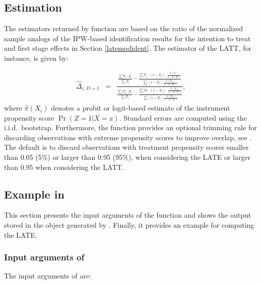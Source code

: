\documentclass[nojss]{jss}
\begin{document}
\subsection{Estimation}

The estimators returned by function  are based on the ratio of the normalized sample analogs of the IPW-based identification results for the intention to treat and first stage effects in Section \ref{latemodident}. The estimator of the LATT, for instance, is given by:

\begin{eqnarray}\label{late8}
\hat{\Delta}_{c,D=1} &=& \frac{\frac{\sum Y_i \cdot Z_i}{\sum Z_i} - \frac{\sum Y_i \cdot (1-Z_i)\cdot \frac{\hat{\pi}(X_i)}{1-\hat{\pi}(X_i)}}{\sum (1-Z_i) \frac{\hat{\pi}(X_i)}{1-\hat{\pi}(X_i)}}}
{\frac{\sum D_i \cdot Z_i}{\sum Z_i} - \frac{\sum D_i \cdot (1-Z_i)\cdot \frac{\hat{\pi}(X_i)}{1-\hat{\pi}(X_i)}}{\sum (1-Z_i) \frac{\hat{\pi}(X_i)}{1-\hat{\pi}(X_i)}}},
\end{eqnarray}
where $\hat{\pi}(X_i)$ denotes a probit or logit-based estimate of the instrument propensity score $\Pr(Z=1|X=x)$. Standard errors are computed using the i.i.d.\ bootstrap. Furthermore, the  function provides an optional trimming rule for discarding observations with extreme propensity scores to improve overlap, see \citet{CrHoImMi09}. The default is to discard observations with treatment propensity scores smaller than 0.05 (5\%) or larger than 0.95 (95\%), when considering the LATE or larger than 0.95 when considering the LATT.

\subsection[{Example in R}]{Example in }

This section presents the input arguments of the  function and shows the output stored in the object generated by . Finally, it provides an example for computing the LATE.

\subsubsection[{Input arguments of lateweight}]{Input arguments of }

The input arguments of  are:
\end{document}
